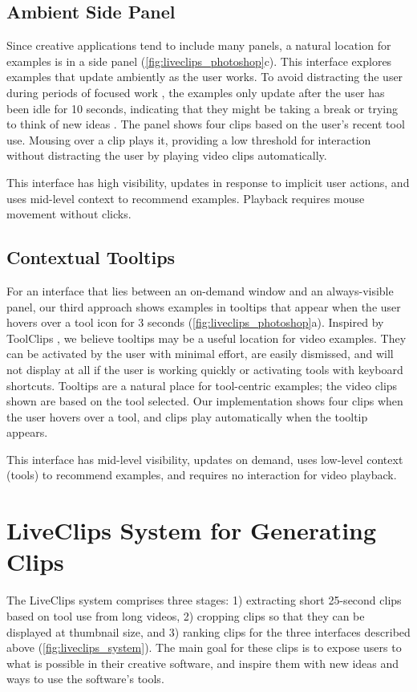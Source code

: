 \subsection{Ambient Side Panel}
Since creative applications tend to include many panels, a natural location for examples is in a side panel (\autoref{fig:liveclips_photoshop}c). This interface explores examples that update ambiently as the user works. To avoid distracting the user during periods of focused work \cite{Chan2017}, the examples only update after the user has been idle for 10 seconds, indicating that they might be taking a break or trying to think of new ideas \cite{Siangliulue2015}. The panel shows four clips based on the user's recent tool use. Mousing over a clip plays it, providing a low threshold for interaction without distracting the user by playing video clips automatically.

This interface has high visibility, updates in response to implicit user actions, and uses mid-level context to recommend examples. Playback requires mouse movement without clicks.

\subsection{Contextual Tooltips}
For an interface that lies between an on-demand window and an always-visible panel, our third approach shows examples in tooltips that appear when the user hovers over a tool icon for 3 seconds (\autoref{fig:liveclips_photoshop}a). Inspired by ToolClips \cite{Grossman2010a}, we believe tooltips may be a useful location for video examples. They can be activated by the user with minimal effort, are easily dismissed, and will not display at all if the user is working quickly or activating tools with keyboard shortcuts.
Tooltips are a natural place for tool-centric examples; the video clips shown are based on the tool selected. Our implementation shows four clips when the user hovers over a tool, and clips play automatically when the tooltip appears.

This interface has mid-level visibility, updates on demand, uses low-level context (tools) to recommend examples, and requires no interaction for video playback. 

\section{LiveClips System for Generating Clips}
The LiveClips system comprises three stages: 1) extracting short 25-second clips based on tool use from long videos, 2) cropping clips so that they can be displayed at thumbnail size, and 3) ranking clips for the three interfaces described above (\autoref{fig:liveclips_system}). The main goal for these clips is to expose users to what is possible in their creative software, and inspire them with new ideas and ways to use the software's tools.

